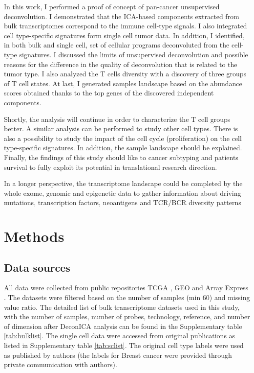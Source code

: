 \documentclass[12pt,]{book}
\theoremstyle{definition}
\theoremstyle{definition}
\theoremstyle{definition}
\theoremstyle{remark}
\begin{document}
In this work, I performed a proof of concept of pan-cancer unsupervised
deconvolution. I demonstrated that the ICA-based components extracted
from bulk transcriptomes correspond to the immune cell-type signals. I
also integrated cell type-specific signatures form single cell tumor
data. In addition, I identified, in both bulk and single cell, set of
cellular programs deconvoluted from the cell-type signatures. I
discussed the limits of unsupervised deconvolution and possible reasons
for the difference in the quality of deconvolution that is related to
the tumor type. I also analyzed the T cells diversity with a discovery
of three groups of T cell states. At last, I generated samples landscape
based on the abundance scores obtained thanks to the top genes of the
discovered independent components.

Shortly, the analysis will continue in order to characterize the T cell
groups better. A similar analysis can be performed to study other cell
types. There is also a possibility to study the impact of the cell cycle
(proliferation) on the cell type-specific signatures. In addition, the
sample landscape should be explained. Finally, the findings of this
study should like to cancer subtyping and patients survival to fully
exploit its potential in translational research direction.

In a longer perspective, the transcriptome landscape could be completed
by the whole exome, genomic and epigenetic data to gather information
about driving mutations, transcription factors, neoantigens and TCR/BCR
diversity patterns

\clearpage

\hypertarget{methods-1}{%
\section{Methods}\label{methods-1}}

\hypertarget{data-sources}{%
\subsection{Data sources}\label{data-sources}}

All data were collected from public repositories TCGA
\citep{Cancer2012}, GEO \citep{Edgar2002} and Array Express
\citep{Kolesnikov2015}. The datasets were filtered based on the number
of samples (min 60) and missing value ratio. The detailed list of bulk
transcriptome datasets used in this study, with the number of samples,
number of probes, technology, reference, and number of dimension after
DeconICA analysis can be found in the Supplementary table
\ref{tab:bulklist}. The single cell data were accessed from original
publications as listed in Supplementary table \ref{tab:sclist}. The
original cell type labels were used as published by authors (the labels
for Breast cancer \citep{Chung2017} were provided through private
communication with authors).
\end{document}
